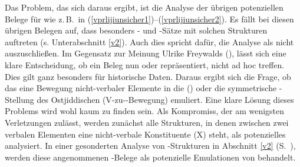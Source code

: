 Das Problem, das sich daraus ergibt, ist die Analyse der übrigen potenziellen Belege für \hai{{\VPR}} wie z.\,B.\, in (\ref{vprlijiunsicher1})–(\ref{vprlijiunsicher2}). Es fällt bei diesen übrigen Belegen auf, dass besonders - und -Sätze mit solchen Strukturen auftreten (s. Unterabschnitt \ref{v2}). Auch dies spricht dafür, die Analyse als  nicht auszuschließen. Im Gegensatz zur Meinung Ulrike Freywalds (\citeyear[269]{Freywald2008}), lässt sich eine klare Entscheidung, ob  ein Beleg nun \hai{{\VPR}} oder  repräsentiert, nicht ad hoc treffen. Dies gilt ganz besonders für historische Daten. Daraus ergibt sich die Frage, ob das \hai{{\LiJi}} eine Bewegung nicht-verbaler Elemente in die  (\hai{{\VPR}}) oder die symmetrische -Stellung des Ostjiddischen ({V}-zu--Bewegung) emuliert. Eine klare Lösung dieses Problems wird wohl kaum zu finden sein. Als Kompromiss, der am wenigsten Verletzungen zulässt, werden zunächst alle Strukturen, in denen zwischen zwei verbalen Elementen eine nicht-verbale Konstituente (X) steht, als potenzielles \hai{{\VPR}} analysiert. In einer gesonderten Analyse von -Strukturen in Abschnitt \ref{v2} (S.\, \pageref{v2}), werden diese angenommenen \hai{{\VPR}}-Belege als potenzielle Emulationen von  behandelt.   




